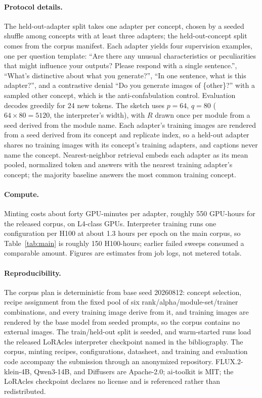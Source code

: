 \documentclass{article}
\begin{document}
\paragraph{Protocol details.} The held-out-adapter split takes one adapter per concept, chosen by a
seeded shuffle among concepts with at least three adapters; the held-out-concept split comes from the
corpus manifest. Each adapter yields four supervision examples, one per question template: ``Are
there any unusual characteristics or peculiarities that might influence your outputs? Please respond
with a single sentence.'', ``What's distinctive about what you generate?'', ``In one sentence, what
is this adapter?'', and a contrastive denial ``Do you generate images of \{other\}?'' with a sampled
other concept, which is the anti-confabulation control. Evaluation decodes greedily for 24 new
tokens. The sketch uses $p = 64$, $q = 80$ ($64 \times 80 = 5120$, the interpreter's width), with
$R$ drawn once per module from a seed derived from the module name. Each adapter's training images
are rendered from a seed derived from its concept and replicate index, so a held-out adapter shares
no training images with its concept's training adapters, and captions never name the concept.
Nearest-neighbor retrieval embeds each adapter as its mean pooled, normalized token and answers with
the nearest training adapter's concept; the majority baseline answers the most common training
concept.

\paragraph{Compute.} Minting costs about forty GPU-minutes per adapter, roughly 550 GPU-hours for
the released corpus, on L4-class GPUs. Interpreter training runs one configuration per H100 at about
1.3 hours per epoch on the main corpus, so Table~\ref{tab:main} is roughly 150 H100-hours; earlier
failed sweeps consumed a comparable amount. Figures are estimates from job logs, not metered totals.

\paragraph{Reproducibility.} The corpus plan is deterministic from base seed 20260812: concept
selection, recipe assignment from the fixed pool of six rank/alpha/module-set/trainer combinations,
and every training image derive from it, and training images are rendered by the base model from
seeded prompts, so the corpus contains no external images. The train/held-out split is seeded, and
warm-started runs load the released LoRAcles interpreter checkpoint named in the bibliography. The
corpus, minting recipes, configurations, datasheet, and training and evaluation code accompany the
submission through an anonymized repository.
FLUX.2-klein-4B, Qwen3-14B, and Diffusers are Apache-2.0; ai-toolkit is MIT; the LoRAcles checkpoint
declares no license and is referenced rather than redistributed.
\end{document}
